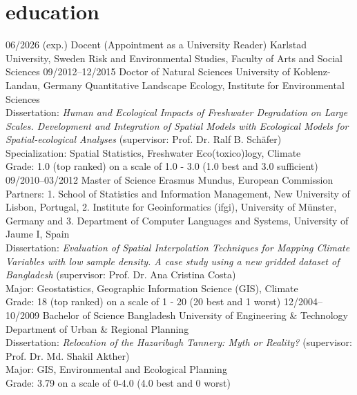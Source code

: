 \documentclass[]{friggeri-cv} %
\begin{document}
\section{education}

\begin{entrylist}
\entry
{\small{06/2026 (exp.)}}
{Docent (Appointment as a University Reader)}
{Karlstad University, Sweden}
{Risk and Environmental Studies, Faculty of Arts and Social Sciences}
\entry
{\small{09/2012--12/2015}}
{Doctor of Natural Sciences}
{University of Koblenz-Landau, Germany}
{Quantitative Landscape Ecology, Institute for Environmental Sciences\\
Dissertation: {\emph{Human and Ecological Impacts of Freshwater Degradation on Large Scales. Development and Integration of Spatial Models with Ecological Models for Spatial-ecological Analyses} (supervisor: Prof. Dr. Ralf B. Sch\"afer)} \\
Specialization: Spatial Statistics, Freshwater Eco(toxico)logy, Climate\\
Grade: 1.0 (top ranked) on a scale of 1.0 - 3.0 (1.0 best and 3.0 sufficient)}
\entry
{\small{09/2010--03/2012}}
{Master of Science {}}
{Erasmus Mundus, European Commission}
{Partners: 1. School of Statistics and Information Management, New University of Lisbon, Portugal, 2. Institute for Geoinformatics (ifgi), University of M\"unster, Germany and 3. Department of Computer Languages and Systems, University of Jaume I, Spain\\
Dissertation: {\emph{Evaluation of Spatial Interpolation Techniques for Mapping Climate Variables with low sample density. A case study using a new gridded dataset of Bangladesh} (supervisor: Prof. Dr. Ana Cristina Costa)} \\
Major: Geostatistics, Geographic Information Science (GIS), Climate \\
Grade: 18 (top ranked) on a scale of 1 - 20 (20 best and 1 worst)}
\entry
{\small{12/2004--10/2009}}
{Bachelor of Science {}}
{\scriptsize{Bangladesh University of Engineering \& Technology}}
{Department of Urban \& Regional Planning\\
Dissertation: {\emph{Relocation of the Hazaribagh Tannery: Myth or Reality?} (supervisor: Prof. Dr. Md. Shakil Akther)}\\
Major: GIS, Environmental and Ecological Planning \\
Grade: 3.79 on a scale of 0-4.0 (4.0 best and 0 worst)}
\end{entrylist}
\end{document}
